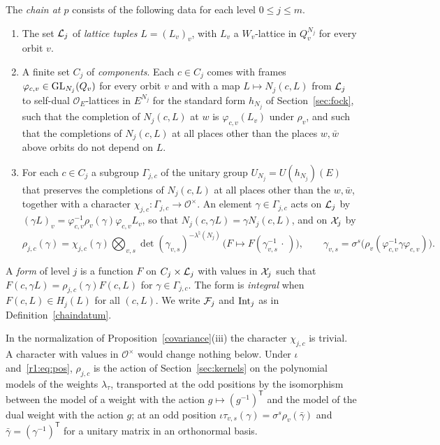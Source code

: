 \begin{definition}\label{r1:def:chain}
The \emph{chain at $p$} consists of the following data for each level $0\le j\le m$.
\begin{enumerate}
\item[(a)] The set $\mathcal L_j$ of \emph{lattice tuples} $L=(L_v)_v$, with $L_v$ a $W_v$-lattice in $Q_v^{N_j}$ for every orbit $v$.
\item[(b)] A finite set $C_j$ of \emph{components}. Each $c\in C_j$ comes with frames $\varphi_{c,v}\in\operatorname{GL}_{N_j}(Q_v)$ for every orbit $v$ and with a map $L\mapsto N_j(c,L)$ from $\mathcal L_j$ to self-dual $\mathcal O_E$-lattices in $E^{N_j}$ for the standard form $h_{N_j}$ of Section~\ref{sec:fock}, such that the completion of $N_j(c,L)$ at $w$ is $\varphi_{c,v}(L_v)$ under $\rho_v$, and such that the completions of $N_j(c,L)$ at all places other than the places $w,\bar w$ above orbits do not depend on $L$.
\item[(c)] For each $c\in C_j$ a subgroup $\Gamma_{j,c}$ of the unitary group $U_{N_j}=U(h_{N_j})(E)$ that preserves the completions of $N_j(c,L)$ at all places other than the $w,\bar w$, together with a character $\chi_{j,c}\colon\Gamma_{j,c}\to\mathcal O^\times$. An element $\gamma\in\Gamma_{j,c}$ acts on $\mathcal L_j$ by $(\gamma L)_v=\varphi_{c,v}^{-1}\rho_v(\gamma)\varphi_{c,v}L_v$, so that $N_j(c,\gamma L)=\gamma N_j(c,L)$, and on $\mathcal X_j$ by
\[
\rho_{j,c}(\gamma)=\chi_{j,c}(\gamma)\bigotimes_{v,s}\det(\gamma_{v,s})^{-\lambda^\natural(N_j)}\,\big(F\mapsto F(\gamma_{v,s}^{-1}\,\cdot\,)\big),\qquad\gamma_{v,s}=\sigma^s\big(\rho_v(\varphi_{c,v}^{-1}\gamma\varphi_{c,v})\big).
\]
\end{enumerate}
A \emph{form} of level $j$ is a function $F$ on $C_j\times\mathcal L_j$ with values in $\mathcal X_j$ such that $F(c,\gamma L)=\rho_{j,c}(\gamma)F(c,L)$ for $\gamma\in\Gamma_{j,c}$. The form is \emph{integral} when $F(c,L)\in H_j(L)$ for all $(c,L)$. We write $\mathcal F_j$ and $\mathrm{Int}_j$ as in Definition~\ref{chaindatum}.
\end{definition}

In the normalization of Proposition~\ref{covariance}(iii) the character $\chi_{j,c}$ is trivial. A character with values in $\mathcal O^\times$ would change nothing below. Under $\iota$ and~\eqref{r1:eq:pos}, $\rho_{j,c}$ is the action of Section~\ref{sec:kernels} on the polynomial models of the weights $\lambda_\tau$, transported at the odd positions by the isomorphism between the model of a weight with the action $g\mapsto(g^{-1})^{\mathsf T}$ and the model of the dual weight with the action $g$; at an odd position $\iota\tau_{v,s}(\gamma)=\sigma^s\rho_v(\bar\gamma)$ and $\bar\gamma=(\gamma^{-1})^{\mathsf T}$ for a unitary matrix in an orthonormal basis.

